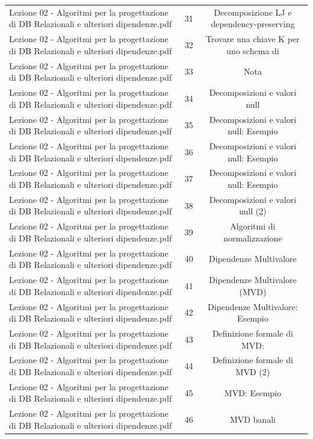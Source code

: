\documentclass[11pt]{article}
\begin{document}
\begin{longtable}{@{}p{}cc@{}}
Lezione 02 - Algoritmi per la progettazione di DB Relazionali e ulteriori dipendenze.pdf & 31 & Decomposizione LJ e dependency-preserving \\
Lezione 02 - Algoritmi per la progettazione di DB Relazionali e ulteriori dipendenze.pdf & 32 & Trovare una chiave K per uno schema di \\
Lezione 02 - Algoritmi per la progettazione di DB Relazionali e ulteriori dipendenze.pdf & 33 & Nota \\
Lezione 02 - Algoritmi per la progettazione di DB Relazionali e ulteriori dipendenze.pdf & 34 & Decomposizioni e valori null \\
Lezione 02 - Algoritmi per la progettazione di DB Relazionali e ulteriori dipendenze.pdf & 35 & Decomposizioni e valori null: Esempio \\
Lezione 02 - Algoritmi per la progettazione di DB Relazionali e ulteriori dipendenze.pdf & 36 & Decomposizioni e valori null: Esempio \\
Lezione 02 - Algoritmi per la progettazione di DB Relazionali e ulteriori dipendenze.pdf & 37 & Decomposizioni e valori null: Esempio \\
Lezione 02 - Algoritmi per la progettazione di DB Relazionali e ulteriori dipendenze.pdf & 38 & Decomposizioni e valori null (2) \\
Lezione 02 - Algoritmi per la progettazione di DB Relazionali e ulteriori dipendenze.pdf & 39 & Algoritmi di normalizzazione \\
Lezione 02 - Algoritmi per la progettazione di DB Relazionali e ulteriori dipendenze.pdf & 40 & Dipendenze Multivalore \\
Lezione 02 - Algoritmi per la progettazione di DB Relazionali e ulteriori dipendenze.pdf & 41 & Dipendenze Multivalore (MVD) \\
Lezione 02 - Algoritmi per la progettazione di DB Relazionali e ulteriori dipendenze.pdf & 42 & Dipendenze Multivalore: Esempio \\
Lezione 02 - Algoritmi per la progettazione di DB Relazionali e ulteriori dipendenze.pdf & 43 & Definizione formale di MVD: \\
Lezione 02 - Algoritmi per la progettazione di DB Relazionali e ulteriori dipendenze.pdf & 44 & Definizione formale di MVD (2) \\
Lezione 02 - Algoritmi per la progettazione di DB Relazionali e ulteriori dipendenze.pdf & 45 & MVD: Esempio \\
Lezione 02 - Algoritmi per la progettazione di DB Relazionali e ulteriori dipendenze.pdf & 46 & MVD banali \\

\end{longtable}
\end{document}

